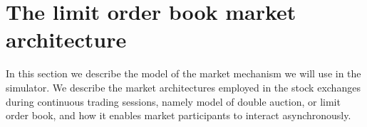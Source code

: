 \section{The limit order book market architecture}
\label{Chapters/Background/Market-Architecture}

In this section we describe the model of the market mechanism we will use in the simulator. We describe the market architectures employed in the stock exchanges during continuous trading sessions, namely model of double auction, or limit order book, and how it enables market participants to interact asynchronously. 

\subsection{}
